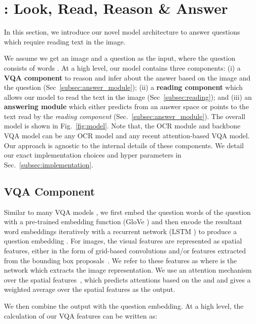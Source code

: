 \documentclass[10pt,twocolumn,letterpaper]{article}
\begin{document}
\section{\approachNameShort:
Look, Read, Reason \& Answer}
\label{sec:model}
\vspace{-1mm}
In this section, we introduce our novel model architecture to answer  questions which require reading text in the image.

We assume we get an image  and a question  as the input, where the question consists of  words . At a high level, our model contains three components: (i) a \textbf{VQA component} to reason and infer about the answer based on the image  and the question  (Sec~\ref{subsec:answer_module}); (ii) a \textbf{reading component} which allows our model to read the text in the image (Sec~\ref{subsec:reading}); and (iii) an \textbf{answering module} which either predicts from an answer space or points to the text read by the \textit{reading component} (Sec.~\ref{subsec:answer_module}). The overall model is shown in Fig.~\ref{fig:model}. Note that, the OCR module and backbone VQA model can be any OCR model and any recent attention-based VQA model. Our approach is agnostic to the internal details of these components. 
We detail our exact implementation choices and hyper parameters in Sec.~\ref{subsec:implementation}. 

\subsection{VQA Component}
\label{subsection:vqa_component}
Similar to many VQA models \cite{fukui2016multimodal,jiang2018pythia}, we first embed the question words  of the question  with a pre-trained embedding function (\eg GloVe \cite{pennington2014glove}) and then encode the resultant word embeddings iteratively with a recurrent network (\eg LSTM \cite{hochreiter1997long}) to produce a question embedding . For images, the visual features are represented as spatial features, either in the form of grid-based convolutions and/or features extracted from the bounding box proposals~\cite{anderson2017bottom}. We refer to these features as  where  is the network which extracts the image representation.
We use an attention mechanism  over the spatial features~\cite{bahdanau2014neural,fukui2016multimodal}, which predicts attentions based on the  and  and gives a weighted average over the spatial features as the output. 

We then combine the output with the question embedding. At a high level, the calculation of our VQA features  can be written as:
\end{document}
